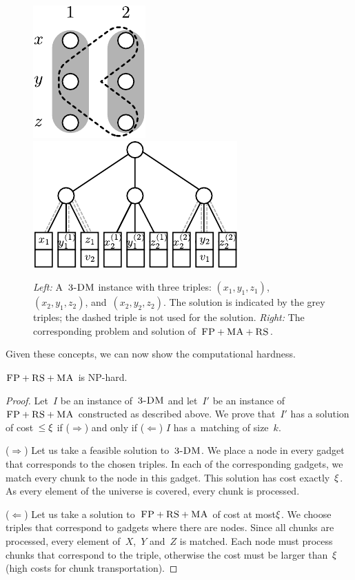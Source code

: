 \begin{figure}[t]
\hfill
\includegraphics[width = 0.3\columnwidth]{figs/static-mapping/np_3dm_formular}
\hfill
\includegraphics[width = 0.5\columnwidth]{figs/static-mapping/np_3dm_construction}
\caption{\textit{Left:} A~$\textsc{3-DM}$ instance with three triples:
$(x_1, y_1, z_1)$,~$(x_2, y_1, z_2)$, and~$(x_2, y_2, z_2)$. The solution is
indicated by the grey triples; the dashed triple is not used for the
solution. \textit{Right:} The corresponding problem and solution of~$\textsc{FP} + \textsc{MA}
+ \textsc{RS}$.}
\hfill
\label{fig:fprsma}
\end{figure}


Given these concepts, we can now show the computational hardness.
\begin{theorem}
$\textsc{FP}+\textsc{RS}+\textsc{MA}$ is NP-hard.
\end{theorem}
\begin{proof}
Let~$I$ be an instance of~$\textsc{3-DM}$ and let~$I'$ be an instance of
$\textsc{FP}+\textsc{RS}+\textsc{MA}$ constructed as described above. We prove that~$I'$ has a solution of cost~$\leq \xi$ if ($\Rightarrow$) and only if
($\Leftarrow$)
$I$ has a~matching of size~$k$.

($\Rightarrow$) Let us take a feasible solution to~$\textsc{3-DM}$. We place a node in every
gadget that corresponds to the chosen triples. In each of the corresponding
gadgets, we match every chunk to the node in this gadget. This
solution has
cost exactly~$\xi$. As every element of the universe is covered, every
chunk is processed.

($\Leftarrow$) Let us take a solution to~$\textsc{FP}+\textsc{RS}+\textsc{MA}$ of cost at most$\xi$. We
choose triples that correspond to gadgets where there are nodes. Since
all chunks are processed, every element of~$X$,~$Y$ and~$Z$ is matched. Each
node must process chunks that
correspond to the triple, otherwise the
cost must be larger than~$\xi$ (high costs for chunk
transportation).
\end{proof}


